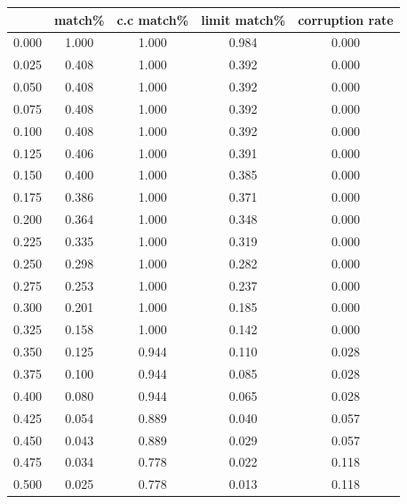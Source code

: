 \documentclass{article}
\begin{document}
\begin{table}[]
  \centering
  \begin{tabular}{
  >{\columncolor[HTML]{FFE599}}c 
  >{\columncolor[HTML]{B6D7A8}}c 
  >{\columncolor[HTML]{9FC5E8}}c 
  >{\columncolor[HTML]{F9CB9C}}c 
  >{\columncolor[HTML]{D9D2E9}}c }
  \cline{1-1}
  \multicolumn{1}{|c|}{\cellcolor[HTML]{F1C232}threshold} &
    \cellcolor[HTML]{6AA84F}match\% &
    \cellcolor[HTML]{3C78D8}c.c match\% &
    \cellcolor[HTML]{E69138}limit match\% &
    \cellcolor[HTML]{8E7CC3}corruption rate \\ \cline{1-1}
  0.000 & 1.000 & 1.000 & 0.984 & 0.000 \\
  0.025 & 0.408 & 1.000 & 0.392 & 0.000 \\
  0.050 & 0.408 & 1.000 & 0.392 & 0.000 \\
  0.075 & 0.408 & 1.000 & 0.392 & 0.000 \\
  0.100 & 0.408 & 1.000 & 0.392 & 0.000 \\
  0.125 & 0.406 & 1.000 & 0.391 & 0.000 \\
  0.150 & 0.400 & 1.000 & 0.385 & 0.000 \\
  0.175 & 0.386 & 1.000 & 0.371 & 0.000 \\
  0.200 & 0.364 & 1.000 & 0.348 & 0.000 \\
  0.225 & 0.335 & 1.000 & 0.319 & 0.000 \\
  0.250 & 0.298 & 1.000 & 0.282 & 0.000 \\
  0.275 & 0.253 & 1.000 & 0.237 & 0.000 \\
  0.300 & 0.201 & 1.000 & 0.185 & 0.000 \\
  0.325 & 0.158 & 1.000 & 0.142 & 0.000 \\
  0.350 & 0.125 & 0.944 & 0.110 & 0.028 \\
  0.375 & 0.100 & 0.944 & 0.085 & 0.028 \\
  0.400 & 0.080 & 0.944 & 0.065 & 0.028 \\
  \cellcolor[HTML]{FF0000}0.425 &
    \cellcolor[HTML]{FF0000}0.054 &
    \cellcolor[HTML]{FF0000}0.889 &
    \cellcolor[HTML]{FF0000}0.040 &
    \cellcolor[HTML]{FF0000}0.057 \\
  0.450 & 0.043 & 0.889 & 0.029 & 0.057 \\
  0.475 & 0.034 & 0.778 & 0.022 & 0.118 \\
  0.500 & 0.025 & 0.778 & 0.013 & 0.118 \\

\end{tabular}
\end{table}
\end{document}

